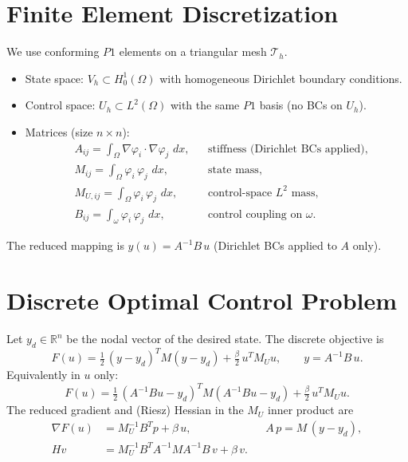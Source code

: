 \documentclass[11pt,a4paper]{article}
\newcommand{\dx}{\,dx}
\begin{document}
\section{Finite Element Discretization}
We use conforming $P1$ elements on a triangular mesh $\mathcal T_h$.
\begin{itemize}
  \item State space: $V_h\subset H_0^1(\Omega)$ with homogeneous Dirichlet boundary conditions.
  \item Control space: $U_h\subset L^2(\Omega)$ with the same $P1$ basis (no BCs on $U_h$).
  \item Matrices (size $n\times n$):
  \begin{align}
    &A_{ij} = \int_{\Omega} \nabla \varphi_i\!\cdot\!\nabla \varphi_j\,\dx, &&\text{stiffness (Dirichlet BCs applied)},\\
    &M_{ij} = \int_{\Omega} \varphi_i\,\varphi_j\,\dx, &&\text{state mass},\\
    &M_{U,ij} = \int_{\Omega} \varphi_i\,\varphi_j\,\dx, &&\text{control-space $L^2$ mass},\\
    &B_{ij} = \int_{\omega} \varphi_i\,\varphi_j\,\dx, &&\text{control coupling on $\omega$}.
  \end{align}
\end{itemize}

The reduced mapping is $y(u)=A^{-1} B\,u$ (Dirichlet BCs applied to $A$ only).

\section{Discrete Optimal Control Problem}
Let $y_d\in\mathbb R^n$ be the nodal vector of the desired state. The discrete objective is
\begin{equation}
  F(u) = \tfrac12\,(y-y_d)^T M (y-y_d) + \tfrac{\beta}{2}\, u^T M_U u,\qquad y = A^{-1}B\,u.
\end{equation}
Equivalently in $u$ only:
\begin{equation}
  F(u) = \tfrac12\,(A^{-1}Bu-y_d)^T M (A^{-1}Bu-y_d) + \tfrac{\beta}{2}\, u^T M_U u.
\end{equation}
The reduced gradient and (Riesz) Hessian in the $M_U$ inner product are
\begin{align}
  \nabla F(u) &= M_U^{-1} B^T p + \beta\,u, && A\,p = M\,(y-y_d),\\
  H v &= M_U^{-1} B^T A^{-1} M A^{-1} B\, v + \beta\,v.
\end{align}
\end{document}
